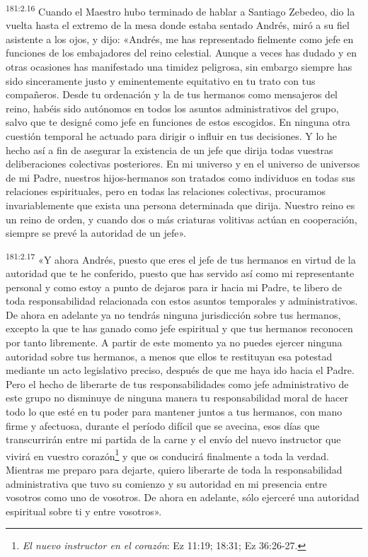 \par
\textsuperscript{181:2.16} Cuando el Maestro hubo terminado de hablar a Santiago Zebedeo, dio la vuelta hasta el extremo de la mesa donde estaba sentado Andrés, miró a su fiel asistente a los ojos, y dijo: «Andrés, me has representado fielmente como jefe en funciones de los embajadores del reino celestial. Aunque a veces has dudado y en otras ocasiones has manifestado una timidez peligrosa, sin embargo siempre has sido sinceramente justo y eminentemente equitativo en tu trato con tus compañeros. Desde tu ordenación y la de tus hermanos como mensajeros del reino, habéis sido autónomos en todos los asuntos administrativos del grupo, salvo que te designé como jefe en funciones de estos escogidos. En ninguna otra cuestión temporal he actuado para dirigir o influir en tus decisiones. Y lo he hecho así a fin de asegurar la existencia de un jefe que dirija todas vuestras deliberaciones colectivas posteriores. En mi universo y en el universo de universos de mi Padre, nuestros hijos-hermanos son tratados como individuos en todas sus relaciones espirituales, pero en todas las relaciones colectivas, procuramos invariablemente que exista una persona determinada que dirija. Nuestro reino es un reino de orden, y cuando dos o más criaturas volitivas actúan en cooperación, siempre se prevé la autoridad de un jefe».

\par
\textsuperscript{181:2.17} «Y ahora Andrés, puesto que eres el jefe de tus hermanos en virtud de la autoridad que te he conferido, puesto que has servido así como mi representante personal y como estoy a punto de dejaros para ir hacia mi Padre, te libero de toda responsabilidad relacionada con estos asuntos temporales y administrativos. De ahora en adelante ya no tendrás ninguna jurisdicción sobre tus hermanos, excepto la que te has ganado como jefe espiritual y que tus hermanos reconocen por tanto libremente. A partir de este momento ya no puedes ejercer ninguna autoridad sobre tus hermanos, a menos que ellos te restituyan esa potestad mediante un acto legislativo preciso, después de que me haya ido hacia el Padre. Pero el hecho de liberarte de tus responsabilidades como jefe administrativo de este grupo no disminuye de ninguna manera tu responsabilidad moral de hacer todo lo que esté en tu poder para mantener juntos a tus hermanos, con mano firme y afectuosa, durante el período difícil que se avecina, esos días que transcurrirán entre mi partida de la carne y el envío del nuevo instructor que vivirá en vuestro corazón\footnote{\textit{El nuevo instructor en el corazón}: Ez 11:19; 18:31; Ez 36:26-27.} y que os conducirá finalmente a toda la verdad. Mientras me preparo para dejarte, quiero liberarte de toda la responsabilidad administrativa que tuvo su comienzo y su autoridad en mi presencia entre vosotros como uno de vosotros. De ahora en adelante, sólo ejerceré una autoridad espiritual sobre ti y entre vosotros».


